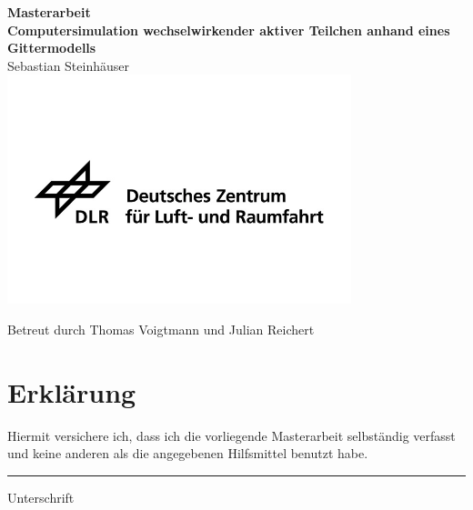 \documentclass[a4paper, 12pt]{report}
\author{Sebastian Steinhäuser}
\begin{document}
\renewcommand{\thepage}{\roman{page}}%
\begin{center}
	\Large{\textbf{Masterarbeit}}
	\\
	\vspace{1cm}
	\Huge{\textbf{Computersimulation wechselwirkender aktiver Teilchen anhand eines Gittermodells}}
	\\
	\vspace{1cm}
	\Large{Sebastian Steinhäuser}
	\includegraphics[width=0.75\textwidth]{DLR.jpg}
\end{center}
\begin{center}
	Betreut durch Thomas Voigtmann und Julian Reichert
\end{center}
\newpage

\chapter*{Erklärung}
Hiermit versichere ich, dass ich die vorliegende Masterarbeit selbständig verfasst und keine anderen als die angegebenen Hilfsmittel benutzt habe.

\vspace{1cm}
\hfill\rule{5cm}{.4pt}\par
\hfill Unterschrift

\newpage
\tableofcontents
\clearpage
\end{document}
